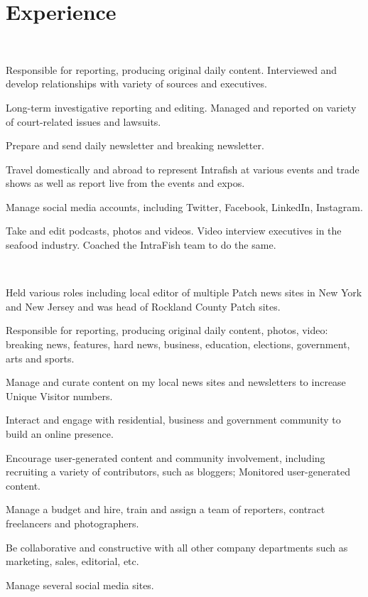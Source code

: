 \documentclass[]{hieudo-build}
\begin{document}
\begin{minipage}[t]{0.62\textwidth} 

\section{Experience}
 \\
\vspace{0.9em} %
\begin{tightemize}
\item Responsible for reporting, producing original daily content. Interviewed and develop relationships with variety of sources and executives.
\item Long-term investigative reporting and editing. Managed and reported on variety of court-related issues and lawsuits.
\item Prepare and send daily newsletter and breaking newsletter.
\item Travel domestically and abroad to represent Intrafish at various events and trade shows as well as report live from the events and expos.
\item Manage social media accounts, including Twitter, Facebook, LinkedIn, Instagram.
\item Take and edit podcasts, photos and videos. Video interview executives in the seafood industry. Coached the IntraFish team to do the same.
\end{tightemize}
\sectionsep

 \\
\begin{tightemize}
\item Held various roles including local editor of multiple Patch news sites in New York and New Jersey and was head of Rockland County Patch sites.
\item Responsible for reporting, producing original daily content, photos, video: breaking news, features, hard news, business, education, elections, government, arts and sports.
\item Manage and curate content on my local news sites and newsletters to increase Unique Visitor numbers.
\item Interact and engage with residential, business and government community to build an online presence.
\item Encourage user-generated content and community involvement, including recruiting a variety of contributors, such as bloggers; Monitored user-generated content.
\item Manage a budget and hire, train and assign a team of reporters, contract freelancers and photographers.
\item Be collaborative and constructive with all other company departments such as marketing, sales, editorial, etc.
\item Manage several social media sites.
\end{tightemize}
\sectionsep



\end{minipage}
\end{document}
